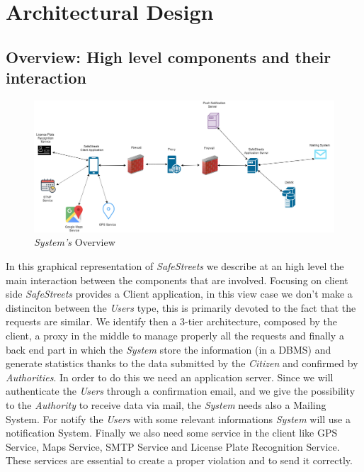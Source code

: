 \documentclass{article}
\begin{document}

\clearpage

\section{Architectural Design}

\subsection{Overview: High level components and their interaction}

\begin{figure}[H]
    \centering
    \includegraphics[scale=0.3]{img/overview.png}
    \caption{\textit{System's} Overview}
\end{figure}

In this graphical representation of \textit{SafeStreets} we describe at an high level the main interaction
between the components that are involved. Focusing on client side \textit{SafeStreets} provides a Client 
application, in this view case we don't make a distinciton between the \textit{Users} type, this is 
primarily devoted to the fact that the requests are similar. We identify then a 3-tier architecture, 
composed by the client, a proxy in the middle to manage properly all the requests and finally a back 
end part in which the \textit{System} store the information (in a DBMS) and generate statistics thanks
to the data submitted by the \textit{Citizen} and confirmed by \textit{Authorities}. In order to do this
we need an application server. Since we will authenticate the \textit{Users} through a confirmation email, 
and we give the possibility to the \textit{Authority} to receive data via mail, the \textit{System} needs
also a Mailing System. For notify the \textit{Users} with some relevant informations \textit{System} will 
use a notification System. Finally we also need some service in the client like GPS Service, Maps Service,
SMTP Service and License Plate Recognition Service. These services are essential to create a proper violation
and to send it correctly.
\end{document}
